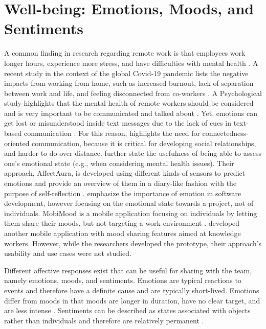 \section{Well-being: Emotions, Moods, and Sentiments}
A common finding in research regarding remote work is that employees work longer hours, experience more stress, and have difficulties with mental health \autocite{mswellbeing, mulki2009set, qualtricksmental}. A recent study in the context of the global Covid-19 pandemic lists the negative impacts from working from home, such as increased burnout, lack of separation between work and life, and feeling disconnected from co-workers \autocite{mswellbeing}. A Psychological study highlights that the mental health of remote workers should be considered and is very important to be communicated and talked about \autocite{grant2013exploration}. Yet, emotions can get lost or misunderstood inside text messages due to the lack of cues in text-based communication \autocite{hook2008interactional}. For this reason, \textcite{kuwabara2002connectedness} highlights the need for connectedness-oriented communication, because it is critical for developing social relationships, and harder to do over distance. \textcite{mcduff2012affectaura} further state the usefulness of being able to assess one’s emotional state (e.g., when considering mental health issues). Their approach, AffectAura, is developed using different kinds of sensors to predict emotions and provide an overview of them in a diary-like fashion with the purpose of self-reflection \autocite{dullemond2013fixing}. \textcite{guzman2013towards} emphasize the importance of emotion in software development, however focusing on the emotional state towards a project, not of individuals. MobiMood is a mobile application focusing on individuals by letting them share their moods, but not targeting a work environment \autocite{church2010study}. \textcite{saari2008mobile} developed another mobile application with mood sharing features aimed at knowledge workers. However, while the researchers developed the prototype, their approach’s usability and use cases were not studied.



Different affective responses exist that can be useful for sharing with the team, namely emotions, moods, and sentiments. Emotions are typical reactions to events and therefore have a definite cause and are typically short-lived. Emotions differ from moods in that moods are longer in duration, have no clear target, and are less intense \autocite{frijda1994varieties, brave2007emotion}. Sentiments can be described as states associated with objects rather than individuals and therefore are relatively permanent \autocite{brave2007emotion}.

